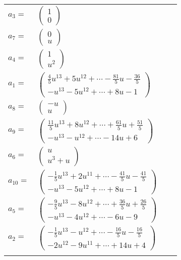 \documentclass[1p]{elsarticle_modified}
\theoremstyle{definition}
\begin{document}
\begin{tabular}{m{7pt} m{180pt} m{7pt} m{180pt} }
\flushright $a_{3}=$&$\begin{pmatrix}1\\0\end{pmatrix}$ \\
\flushright $a_{7}=$&$\begin{pmatrix}0\\u\end{pmatrix}$ \\
\flushright $a_{4}=$&$\begin{pmatrix}1\\u^2\end{pmatrix}$ \\
\flushright $a_{1}=$&$\begin{pmatrix}\frac{4}{5} u^{13}+5 u^{12}+\cdots-\frac{81}{5} u-\frac{36}{5}\\- u^{13}-5 u^{12}+\cdots+8 u-1\end{pmatrix}$ \\
\flushright $a_{8}=$&$\begin{pmatrix}- u\\u\end{pmatrix}$ \\
\flushright $a_{9}=$&$\begin{pmatrix}\frac{11}{5} u^{13}+8 u^{12}+\cdots+\frac{61}{5} u+\frac{51}{5}\\- u^{13}- u^{12}+\cdots-14 u+6\end{pmatrix}$ \\
\flushright $a_{6}=$&$\begin{pmatrix}u\\u^3+u\end{pmatrix}$ \\
\flushright $a_{10}=$&$\begin{pmatrix}-\frac{1}{5} u^{13}+2 u^{11}+\cdots-\frac{41}{5} u-\frac{41}{5}\\- u^{13}-5 u^{12}+\cdots+8 u-1\end{pmatrix}$ \\
\flushright $a_{5}=$&$\begin{pmatrix}-\frac{9}{5} u^{13}-8 u^{12}+\cdots+\frac{36}{5} u+\frac{26}{5}\\- u^{13}-4 u^{12}+\cdots-6 u-9\end{pmatrix}$ \\
\flushright $a_{2}=$&$\begin{pmatrix}-\frac{1}{5} u^{13}- u^{12}+\cdots-\frac{16}{5} u-\frac{16}{5}\\-2 u^{12}-9 u^{11}+\cdots+14 u+4\end{pmatrix}$\\&\end{tabular}
\end{document}
